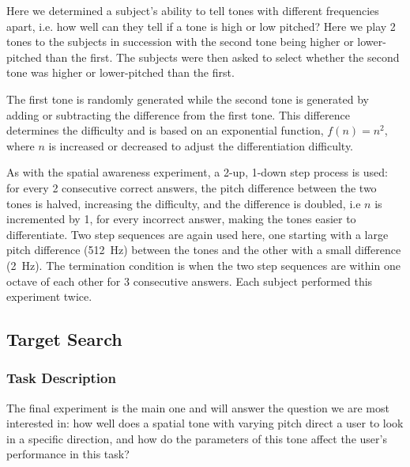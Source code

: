 \documentclass[format=sigconf, review=true, screen=true, anonymous=true]{acmart}
\begin{document}
Here we determined a subject's ability to tell tones with different frequencies apart, i.e. how well can they tell if a tone is high or low pitched? Here we play 2 tones to the subjects in succession with the second tone being higher or lower-pitched than the first. The subjects were then asked to select whether the second tone was higher or lower-pitched than the first.

The first tone is randomly generated while the second tone is generated by adding or subtracting the difference from the first tone. This difference determines the difficulty and is based on an exponential function, $f(n) = n^2$, where $n$ is increased or decreased to adjust the differentiation difficulty. 

As with the spatial awareness experiment, a 2-up, 1-down step process is used: for every 2 consecutive correct answers, the pitch difference between the two tones is halved, increasing the difficulty, and the difference is doubled, i.e $n$ is incremented by 1, for every incorrect answer, making the tones easier to differentiate. Two step sequences are again used here, one starting with a large pitch difference (\SI{512}{\hertz}) between the tones and the other with a small difference (\SI{2}{\hertz}). The termination condition is when the two step sequences are within one octave of each other for 3 consecutive answers. Each subject performed this experiment twice. 


\subsection{Target Search}

\subsubsection{Task Description}

The final experiment is the main one and will answer the question we are most interested in: how well does a spatial tone with varying pitch direct a user to look in a specific direction, and how do the parameters of this tone affect the user's performance in this task? %
\end{document}
